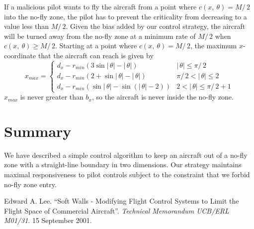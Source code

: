 \documentclass[11pt]{article}
\begin{document}
If a malicious pilot wants to fly the aircraft from a point where 
$c(x,\ \theta) = M/\,2$ into the no-fly zone, the pilot has to prevent the
criticality from decreasing to a value less than $M/\,2$. Given the bias added
by our control strategy, the aircraft will be turned away from the no-fly zone
at a minimum rate of $M/\,2$ when $c(x,\ \theta) \geq M/\,2$. Starting at a
point where $c(x,\ \theta) = M/\,2$, the maximum $x$-coordinate that the
aircraft can reach is given by
\[x_{max} = 
\left\{ \begin{array}{ll}
d_{x} - r_{min}(3\sin\!|\,\theta| - |\,\theta|) & |\,\theta| \leq \pi/\,2
\\
d_{x} - r_{min}(2 + \sin\!|\,\theta| - |\,\theta|) & \pi/\,2 < |\,\theta| \leq 2
\\
d_{x} - r_{min}(\sin\!|\,\theta| - \sin(|\,\theta|-2)) & 2 < |\,\theta| \leq \pi/\,2 + 1
\end{array}
\right.
\]
$x_{max}$ is never greater than $b_x$, so the aircraft is never inside the
no-fly zone.


\section{Summary}

We have described a simple control algorithm to keep an aircraft out
of a no-fly zone with a straight-line boundary in two dimensions.  Our
strategy maintains maximal responsiveness to pilot controls subject to
the constraint that we forbid no-fly zone entry.

\begin{thebibliography}{Lee 2001}

Edward A. Lee.  ``Soft Walls - Modifying Flight Control Systems to
Limit the Flight Space of Commercial Aircraft''.  \textit{Technical
Memorandum UCB/ERL M01/31}.  15 September 2001.

\end{thebibliography}
\end{document}

